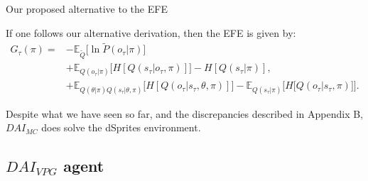 \documentclass[twoside,11pt]{article}
\makeatletter
\newcounter{subsubsubsection}[subsubsection]
\def\subsubsubsection{\@startsection
     {subsubsubsection}{4}{\z@} {-3.25ex plus -1
     ex minus -.2ex}{1.5ex plus .2ex}{\normalsize\bf}}
\makeatother
\begin{document}
\subsubsubsection{Our proposed alternative to the EFE}

If one follows our alternative derivation, then the EFE is given by:
\begin{align*}
G_{\tau}(\pi) = &- \mathbb{E}_{\tilde{Q}}\Big[ \ln \tilde{P}(o_\tau|\pi)\Big]\\
&+ \mathbb{E}_{Q(o_\tau|\pi)}\Big[ H[Q(s_\tau|o_\tau, \pi)] \Big] - H[Q(s_\tau|\pi)],\\
&+ \mathbb{E}_{Q(\theta|\pi)Q(s_\tau|\theta,\pi)}\Big[H[Q(o_\tau|s_\tau,\theta,\pi)] \Big] - \mathbb{E}_{Q(s_\tau|\pi)}\Big[ H\big[ Q(o_\tau|s_\tau, \pi) \big] \Big].
\end{align*}

Despite what we have seen so far, and the discrepancies described in Appendix B, $DAI_{MC}$ does solve the dSprites environment.

\subsection{$DAI_{VPG}$ agent \citep{DeepAI}}
\end{document}
